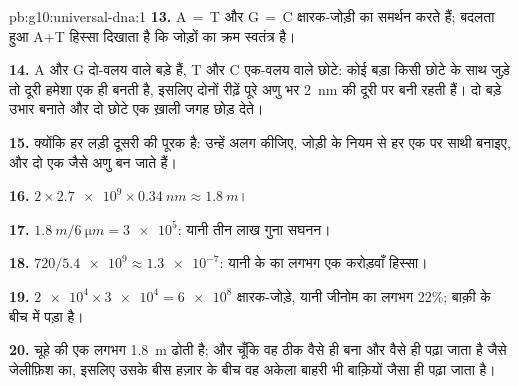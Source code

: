 \begin{solution}{pb:g10:universal-dna:1}
\textbf{13.} A$\,=\,$T और G$\,=\,$C क्षारक-जोड़ी का समर्थन करते हैं;
बदलता हुआ A+T हिस्सा दिखाता है कि जोड़ों का क्रम स्वतंत्र है।

\textbf{14.} A और G दो-वलय वाले बड़े  हैं, T और C एक-वलय वाले
छोटे: कोई बड़ा किसी छोटे के साथ जुड़े तो दूरी हमेशा एक ही बनती है, इसलिए
दोनों रीढ़ें पूरे अणु भर \qty{2}{nm} की दूरी पर बनी रहती हैं। दो बड़े
 उभार बनाते और दो छोटे एक ख़ाली जगह छोड़ देते।

\textbf{15.} क्योंकि हर लड़ी दूसरी की पूरक है: उन्हें अलग कीजिए, जोड़ी
के नियम से हर एक पर साथी बनाइए, और दो एक जैसे अणु बन जाते हैं।

\textbf{16.} $2 \times \num{2.7e9} \times \qty{0.34}{nm} \approx
\qty{1.8}{m}$।

\textbf{17.} $\qty{1.8}{m} / \qty{6}{\micro m} = \num{3e5}$: यानी तीन
लाख गुना सघनन।

\textbf{18.} $720 / \num{5.4e9} \approx \num{1.3e-7}$: यानी  के
 का लगभग एक करोड़वाँ हिस्सा।

\textbf{19.} $\num{2e4} \times \num{3e4} = \num{6e8}$ क्षारक-जोड़े,
यानी जीनोम का लगभग 22\%; बाक़ी  के बीच में पड़ा है।

\textbf{20.} चूहे की एक  लगभग \qty{1.8}{m}  ढोती है; और चूँकि
वह  ठीक वैसे ही बना और वैसे ही पढ़ा जाता है जैसे जेलीफ़िश का, इसलिए
उसके बीस हज़ार  के बीच वह अकेला बाहरी  भी बाक़ियों जैसा ही पढ़ा
जाता है।
\end{solution}
